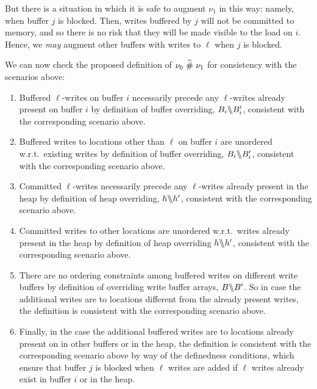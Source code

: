 \documentclass[11pt]{report}
\begin{document}
\begin{enumerate}
  But there is a situation in which it is safe to augment $\nu_1$ in this way: namely, when buffer $j$ is blocked. Then, writes buffered by $j$ will not be committed to memory, and so there is no risk that they will be made visible to the load on $i$. Hence, we \emph{may} augment other buffers with writes to $\ell$ when $j$ is blocked. 

\end{enumerate}

We can now check the proposed definition of $\nu_0 \operatorname{\,\widehat{\#}\,} \nu_1$ for consistency with the scenarios above: \begin{enumerate}
  \item Buffered $\ell$-writes on buffer $i$ necessarily precede any $\ell$-writes already present on buffer $i$ by definition of buffer overriding, $B_i \backslash\!\!\backslash B'_i$, consistent with the corresponding scenario above. 
  
  \item Buffered writes to locations other than $\ell$ on buffer $i$ are unordered w.r.t.\ existing writes by definition of buffer overriding, $B_i \backslash\!\!\backslash B'_i$, consistent with the corresponding scenario above.
  
  \item Committed $\ell$-writes necessarily precede any $\ell$-writes already present in the heap by definition of heap overriding, $h \backslash\!\!\backslash h'$, consistent with the corresponding scenario above. 
  
  \item Committed writes to other locations are unordered w.r.t.~writes already present in the heap by definition of heap overriding $h \backslash\!\!\backslash h'$, consistent with the corresponding scenario above. 
  
  \item There are no ordering constraints among buffered writes on different write buffers by definition of overriding write buffer arrays, $B \backslash\!\!\backslash B'$. So in case the additional writes are to locations different from the already present writes, the definition is consistent with the corresponding scenario above. 
  
  \item Finally, in the case the additional buffered writes are to locations already present on in other buffers or in the heap, the definition is consistent with the corresponding scenario above by way of the definedness conditions, which ensure that buffer $j$ is blocked when $\ell$ writes are added if $\ell$ writes already exist in buffer $i$ or in the heap. 
\end{enumerate}
\end{document}
